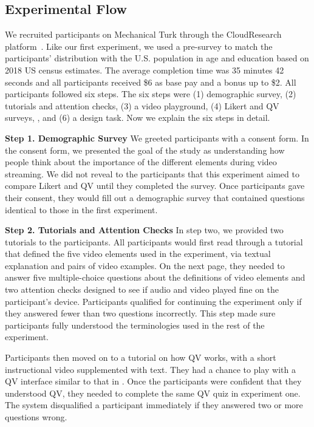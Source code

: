 \subsection{Experimental Flow}
We recruited participants on Mechanical Turk through the CloudResearch platform~\cite{litman2017turkprime}. Like our first experiment, we used a pre-survey to match the participants' distribution with the U.S. population in age and education based on 2018 US census estimates. The average completion time was 35 minutes 42 seconds and all participants received \$6 as base pay and a bonus up to \$2. All participants followed six steps. The six steps were (1) demographic survey, (2) tutorials and attention checks, (3) a video playground, (4) Likert and QV surveys, {}, and (6) a design task. Now we explain the six steps in detail. {}

\textbf{Step 1. Demographic Survey} We greeted participants with a consent form. In the consent form, we presented the goal of the study as understanding how people think about the importance of the different elements during video streaming. We did not reveal to the participants that this experiment aimed to compare Likert and QV until they completed the survey. Once participants gave their consent, they would fill out a demographic survey that contained questions identical to those in the first experiment.

\textbf{Step 2. Tutorials and Attention Checks} In step two, we provided two tutorials to the participants. All participants would first read through a tutorial that defined the five video elements used in the experiment, via textual explanation and pairs of video examples. On the next page, they needed to answer five multiple-choice questions about the definitions of video elements and two attention checks designed to see if audio and video played fine on the participant's device. Participants qualified for continuing the experiment only if they answered fewer than two questions incorrectly. This step made sure participants fully understood the terminologies used in the rest of the experiment.

Participants then moved on to a tutorial on how QV works, with a short instructional video supplemented with text. They had a chance to play with a QV interface similar to that in . Once the participants were confident that they understood QV, they needed to complete the same QV quiz in experiment one. The system disqualified a participant immediately if they answered two or more questions wrong.

